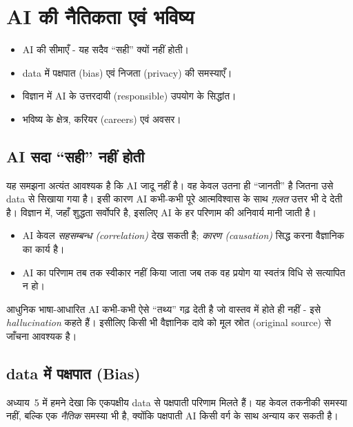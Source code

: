 \chapter{AI की नैतिकता एवं भविष्य}
\label{ch:ethics}

\lakshyaheading
\begin{itemize}[leftmargin=1.4em]
  \item AI की सीमाएँ - यह सदैव “सही” क्यों नहीं होती।
  \item data में पक्षपात (bias) एवं निजता (privacy) की समस्याएँ।
  \item विज्ञान में AI के उत्तरदायी (responsible) उपयोग के सिद्धांत।
  \item भविष्य के क्षेत्र, करियर (careers) एवं अवसर।
\end{itemize}

\section{AI सदा “सही” नहीं होती}

यह समझना अत्यंत आवश्यक है कि AI जादू नहीं है। वह केवल उतना ही “जानती” है जितना उसे
data से सिखाया गया है। इसी कारण AI कभी-कभी पूरे आत्मविश्वास के साथ \emph{ग़लत} उत्तर भी
दे देती है। विज्ञान में, जहाँ शुद्धता सर्वोपरि है, इसलिए AI के हर परिणाम की
 अनिवार्य मानी जाती है।

\begin{itemize}[leftmargin=1.4em]
  \item AI केवल \emph{सहसम्बन्ध (correlation)} देख सकती है; \emph{कारण (causation)}
        सिद्ध करना वैज्ञानिक का कार्य है।
  \item AI का परिणाम तब तक स्वीकार नहीं किया जाता जब तक वह प्रयोग या स्वतंत्र विधि से
        सत्यापित न हो।
\end{itemize}

\begin{jante}
आधुनिक भाषा-आधारित AI कभी-कभी ऐसे “तथ्य” गढ़ देती है जो वास्तव में होते ही नहीं -
इसे \emph{hallucination} कहते हैं। इसीलिए किसी भी वैज्ञानिक दावे को मूल स्रोत
(original source) से जाँचना आवश्यक है।
\end{jante}

\section{data में पक्षपात (Bias)}

अध्याय~5 में हमने देखा कि एकपक्षीय data से पक्षपाती परिणाम मिलते हैं। यह केवल तकनीकी
समस्या नहीं, बल्कि एक \emph{नैतिक} समस्या भी है, क्योंकि पक्षपाती AI किसी वर्ग के साथ
अन्याय कर सकती है।

